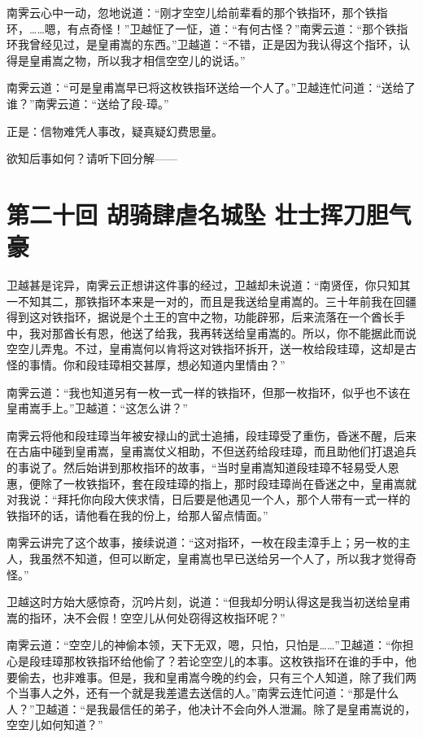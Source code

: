 \documentclass[12pt,oneside]{book}
\begin{document}
南霁云心中一动，忽地说道：``刚才空空儿给前辈看的那个铁指环，那个铁指环，\ldots\ldots 嗯，有点奇怪！''卫越怔了一怔，道：``有何古怪？''南霁云道：``那个铁指环我曾经见过，是皇甫嵩的东西。''卫越道：``不错，正是因为我认得这个指环，认得是皇甫嵩之物，所以我才相信空空儿的说话。''

南霁云道：``可是皇甫嵩早已将这枚铁指环送给一个人了。''卫越连忙问道：``送给了谁？''南霁云道：``送给了段-璋。''

正是：信物难凭人事改，疑真疑幻费思量。

欲知后事如何？请听下回分解------

\chapter{第二十回 胡骑肆虐名城坠
壮士挥刀胆气豪}\label{ux7b2cux4e8cux5341ux56de-ux80e1ux9a91ux8086ux8650ux540dux57ceux5760-ux58eeux58ebux6325ux5200ux80c6ux6c14ux8c6a}

卫越甚是诧异，南霁云正想讲这件事的经过，卫越却未说道：``南贤侄，你只知其一不知其二，那铁指环本来是一对的，而且是我送给皇甫嵩的。三十年前我在回疆得到这对铁指环，据说是个土王的宫中之物，功能辟邪，后来流落在一个酋长手中，我对那酋长有恩，他送了给我，我再转送给皇甫嵩的。所以，你不能据此而说空空儿弄鬼。不过，皇甫嵩何以肯将这对铁指环拆开，送一枚给段珪璋，这却是古怪的事情。你和段珪璋相交甚厚，想必知道内里情由？''

南霁云道：``我也知道另有一枚一式一样的铁指环，但那一枚指环，似乎也不该在皇甫嵩手上。''卫越道：``这怎么讲？''

南霁云将他和段珪璋当年被安禄山的武士追捕，段珪璋受了重伤，昏迷不醒，后来在古庙中碰到皇甫嵩，皇甫嵩仗义相助，不但送药给段珪璋，而且助他们打退追兵的事说了。然后始讲到那枚指环的故事，``当时皇甫嵩知道段珪璋不轻易受人恩惠，便除了一枚铁指环，套在段珪璋的指上，那时段珪璋尚在昏迷之中，皇甫嵩就对我说：``拜托你向段大侠求情，日后要是他遇见一个人，那个人带有一式一样的铁指环的话，请他看在我的份上，给那人留点情面。''

南霁云讲完了这个故事，接续说道：``这对指环，一枚在段圭漳手上；另一枚的主人，我虽然不知道，但可以断定，皇甫嵩也早已送给另一个人了，所以我才觉得奇怪。''

卫越这时方始大感惊奇，沉吟片刻，说道：``但我却分明认得这是我当初送给皇甫嵩的指环，决不会假！空空儿从何处窃得这枚指环呢？''

南霁云道：``空空儿的神偷本领，天下无双，嗯，只怕，只怕是\ldots\ldots{}''卫越道：``你担心是段珪璋那枚铁指环给他偷了？若论空空儿的本事。这枚铁指环在谁的手中，他要偷去，也非难事。但是，我和皇甫嵩今晚的约会，只有三个人知道，除了我们两个当事人之外，还有一个就是我差遣去送信的人。''南霁云连忙问道：``那是什么人？''卫越道：``是我最信任的弟子，他决计不会向外人泄漏。除了是皇甫嵩说的，空空儿如何知道？''
\end{document}
